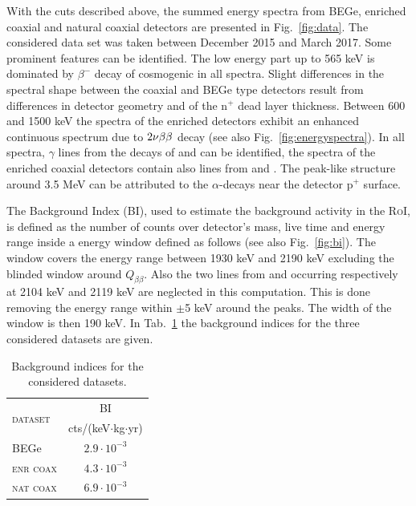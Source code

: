  With the cuts described above, the summed energy spectra from BEGe, enriched coaxial and natural coaxial detectors are presented in Fig.~\ref{fig:data}. The considered data set was taken between December 2015 and March 2017. Some prominent features can be identified. The low energy part up to 565 keV is dominated by $\beta^-$ decay of cosmogenic  in all spectra. Slight differences in the spectral shape between the coaxial and BEGe type detectors result from differences in detector geometry and of the n$^+$ dead layer thickness. Between 600 and 1500 keV the spectra of the enriched detectors exhibit an enhanced continuous spectrum due to $2\nu\beta\beta$ decay (see also Fig.~\ref{fig:energyspectra}). In all spectra, $\gamma$ lines from the decays of  and  can be identified, the spectra of the enriched coaxial detectors contain also lines from  and . The peak-like structure around 3.5 MeV can be attributed to the $\alpha$-decays near the detector p$^+$ surface.

 The Background Index (BI), used to estimate the background activity in the \textsc{RoI}, is defined as the number of counts over detector's mass, live time and energy range inside a energy window defined as follows (see also Fig.~\ref{fig:bi}). The window covers the energy range between 1930 keV and 2190 keV excluding the blinded window around $Q_{\beta\beta}$. Also the two lines from  and  occurring respectively at 2104 keV and 2119 keV are neglected in this computation. This is done removing the energy range within $\pm$5 keV around the peaks. The width of the window is then 190 keV. In Tab.~\ref{tab:bindex} the background indices for the three considered datasets are given.
\begin{table}[b]
	\centering
	\label{tab:bindex}
	\caption{Background indices for the considered datasets.}
	\begin{tabular}{lc}
		\toprule
		\multirow{2}{*}{\textsc{dataset}}	&	BI \\
											&	cts/(keV$\cdot$kg$\cdot$yr) \\
		\midrule
		BEGe								&	$2.9\cdot10^{-3}$	\\
		\textsc{enr coax}					&	$4.3\cdot10^{-3}$	\\
		\textsc{nat coax}					&	$6.9\cdot10^{-3}$	\\
		\bottomrule
	\end{tabular}
\end{table}

